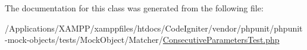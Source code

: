 The documentation for this class was generated from the following file\+:\begin{DoxyCompactItemize}
\item 
/\+Applications/\+X\+A\+M\+P\+P/xamppfiles/htdocs/\+Code\+Igniter/vendor/phpunit/phpunit-\/mock-\/objects/tests/\+Mock\+Object/\+Matcher/\mbox{\hyperlink{_consecutive_parameters_test_8php}{Consecutive\+Parameters\+Test.\+php}}\end{DoxyCompactItemize}
